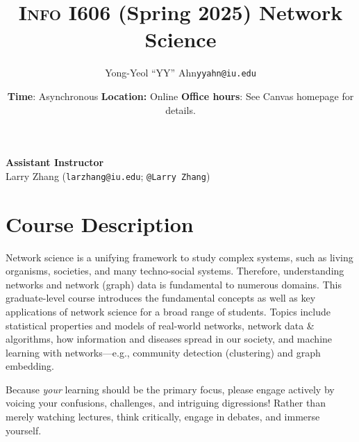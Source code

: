 \documentclass[11pt,article,oneside]{memoir} %
\makeatletter
\def\myauthor{Author}
\def\mytitle{Title}
\def\myemail{yyahn@iu.edu}
\def\myauthor{Yong-Yeol ``YY'' Ahn}
\def\mytitle{{\normalsize \textsc{Info} I606 (Spring 2025) \newline} \HUGE Network Science}
\makeatother
\begin{document}


\def\ind{\hangindent=1 true cm\hangafter=1 \noindent}
\def\labelitemi{$\cdot$}


\title{\LARGE \mytitle}
\author{\Large\myauthor \newline \footnotesize\texttt{\noindent\myemail}}
\date{\textbf{Time}: Asynchronous%
  \newline \textbf{Location:} Online
\newline \textbf{Office hours}: See Canvas homepage for details.}

\maketitle
\vspace{-20pt}
{\bfseries Assistant Instructor} \\ 
Larry Zhang (\texttt{larzhang@iu.edu}; \texttt{@Larry Zhang})\\

\section{Course Description} %

Network science is a unifying framework to study complex systems, such as living organisms, societies, and many techno-social systems. 
Therefore, understanding networks and network (graph) data is fundamental to numerous domains. 
This graduate-level course introduces the fundamental concepts as well as key applications of network science for a broad range of students.
Topics include statistical properties and models of real-world networks, network data \& algorithms, how information and diseases spread in our society, and machine learning with networks---e.g., community detection (clustering) and graph embedding.

Because \emph{your} learning should be the primary focus, please engage actively by voicing your confusions, challenges, and intriguing digressions! Rather than merely watching lectures, think critically, engage in debates, and immerse yourself. 
\end{document}
